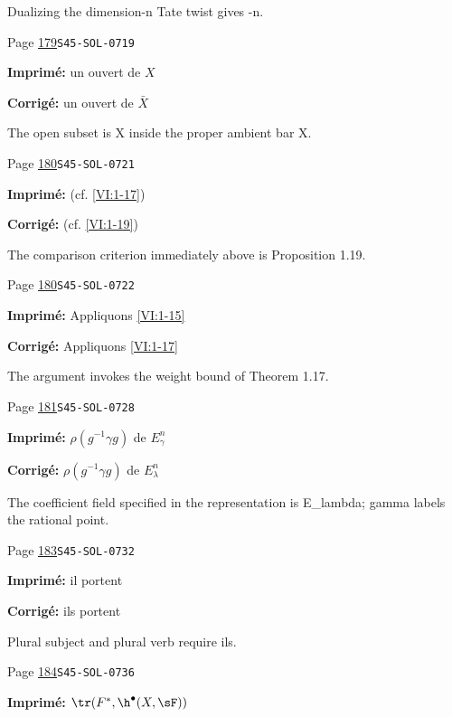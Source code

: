 \begin{description}
\par\noindent Dualizing the dimension-n Tate twist gives -n.
\smallskip
\item[\hypertarget{apparatus:FR-0145}{145}] Page \hyperlink{printpage:fr:179}{179}\quad\texttt{S45-SOL-0719}
\par\noindent\textbf{Imprimé:} un ouvert de $X$
\par\noindent\textbf{Corrigé:} un ouvert de $\bar X$
\par\noindent The open subset is X inside the proper ambient bar X.
\smallskip
\item[\hypertarget{apparatus:FR-0146}{146}] Page \hyperlink{printpage:fr:180}{180}\quad\texttt{S45-SOL-0721}
\par\noindent\textbf{Imprimé:} (cf. \ref{VI:1-17})
\par\noindent\textbf{Corrigé:} (cf. \ref{VI:1-19})
\par\noindent The comparison criterion immediately above is Proposition 1.19.
\smallskip
\item[\hypertarget{apparatus:FR-0147}{147}] Page \hyperlink{printpage:fr:180}{180}\quad\texttt{S45-SOL-0722}
\par\noindent\textbf{Imprimé:} Appliquons \ref{VI:1-15}
\par\noindent\textbf{Corrigé:} Appliquons \ref{VI:1-17}
\par\noindent The argument invokes the weight bound of Theorem 1.17.
\smallskip
\item[\hypertarget{apparatus:FR-0148}{148}] Page \hyperlink{printpage:fr:181}{181}\quad\texttt{S45-SOL-0728}
\par\noindent\textbf{Imprimé:} $\rho(g^{-1} \gamma g)$ de $E_\gamma^n$
\par\noindent\textbf{Corrigé:} $\rho(g^{-1} \gamma g)$ de $E_\lambda^n$
\par\noindent The coefficient field specified in the representation is E\_lambda; gamma labels the rational point.
\smallskip
\item[\hypertarget{apparatus:FR-0149}{149}] Page \hyperlink{printpage:fr:183}{183}\quad\texttt{S45-SOL-0732}
\par\noindent\textbf{Imprimé:} il portent
\par\noindent\textbf{Corrigé:} ils portent
\par\noindent Plural subject and plural verb require ils.
\smallskip
\item[\hypertarget{apparatus:FR-0150}{150}] Page \hyperlink{printpage:fr:184}{184}\quad\texttt{S45-SOL-0736}
\par\noindent\textbf{Imprimé:} \(\tr(F^\ast,\h^\bullet(X,\sF))\)

\end{description}
